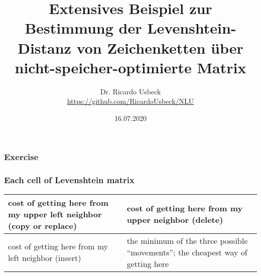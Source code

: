 \documentclass[aspectratio=169]{beamer}
\begin{document}
\title[Extensives Beispiel]{Extensives Beispiel zur Bestimmung der Levenshtein-Distanz von Zeichenketten über nicht-speicher-optimierte Matrix}   
\author[Dr. R. Usbeck]{Dr. Ricardo Usbeck\\\url{https://github.com/RicardoUsbeck/NLU}} 
\date{16.07.2020}

\begin{frame}
\titlepage
\end{frame}

\begin{frame}
\frametitle{Exercise}
\end{frame}



\begin{frame}
\frametitle{Each cell of Levenshtein matrix}

\bigskip

\begin{tabular}{|l|l|}

\hline
\parbox{4cm}{cost of getting here from my upper left neighbor (copy or replace)} & \parbox{4cm}{cost of getting here from my upper neighbor (delete)}\\\hline
\parbox{4cm}{cost of getting here from my left neighbor (insert)} & \parbox{4cm}{the minimum of the three possible   ``movements''; the cheapest way of getting here } \\\hline

\end{tabular}
\end{frame}
\end{document}

